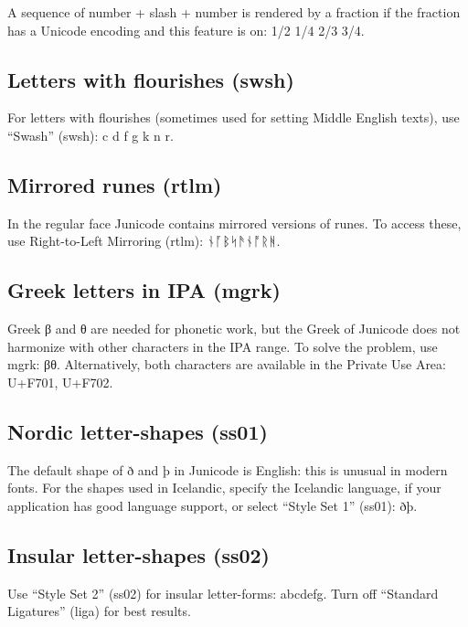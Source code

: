 \documentclass[12pt,a4paper,openany]{book}
\begin{document}
A sequence of number + slash + number is rendered by a fraction if the
fraction has a Unicode encoding and this feature is on:
{ 1/2 1/4 2/3 3/4}.

\subsection*{Letters with flourishes (swsh)}
For letters with flourishes (sometimes used for setting Middle English
texts), use “Swash” (swsh):
{c d f g k n r}.

\subsection*{Mirrored runes (rtlm)}

In the regular face Junicode
contains mirrored versions of runes. To access these, use
Right-to-Left Mirroring (rtlm): {
  ᚾᚪᛒᛋᚫᚾᚩᚱᚻ.}

\subsection*{Greek letters in IPA (mgrk)}

Greek β and θ are needed for phonetic work, but the Greek of Junicode
does not harmonize with other characters in the IPA range. To solve
the problem, use mgrk: {βθ}. Alternatively,
both characters are available in the Private Use Area: U+F701, U+F702.

\subsection*{Nordic letter-shapes (ss01)}

The default shape of ð and þ in Junicode is English: this is unusual in
modern fonts. For the shapes used in Icelandic, specify the Icelandic
language, if your application has good language support, or select
“Style Set 1” (ss01): { ðþ}.

\subsection*{Insular letter-shapes (ss02)}

Use “Style Set 2” (ss02) for insular letter-forms:
{ abcdefg.} Turn off “Standard
Ligatures” (liga) for best results.
\end{document}
